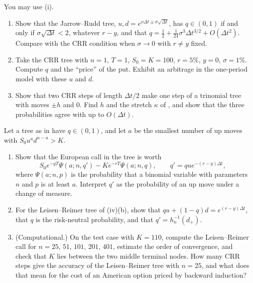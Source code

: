 
\begin{exercise}\label{ex:fd-validity}
\easy You may use (i).
\begin{enumerate}[label=(\alph*)]
  \item Show that the Jarrow--Rudd tree, $u,d=e^{\nu\Delta t\pm\sigma\sqrt{\Delta t}}$, has $q\in(0,1)$ if and only if
    $\sigma\sqrt{\Delta t}<2$, whatever $r-y$, and that $q=\frac12+\frac1{24}\sigma^3\Delta t^{3/2}+O(\Delta t^2)$. Compare with
    the CRR condition when $\sigma\to0$ with $r\ne y$ fixed.
  \item Take the CRR tree with $n=1$, $T=1$, $S_0=K=100$, $r=5\%$, $y=0$, $\sigma=1\%$. Compute $q$ and the
    ``price''  of the put. Exhibit an arbitrage in the one-period model with these $u$
    and $d$.
  \item Show that two CRR steps of length $\Delta t/2$ make one step of a trinomial tree with moves $\pm h$
    and $0$. Find $h$ and the stretch $\kappa$ of , and show that the three probabilities
    agree with  up to $O(\Delta t)$.
\end{enumerate}
\end{exercise}

\begin{exercise}\label{ex:fd-leisen-reimer}
\medium Let a tree as in  have $q\in(0,1)$, and let $a$ be the smallest number of up
moves with $S_0u^ad^{n-a}>K$.
\begin{enumerate}[label=(\alph*)]
  \item Show that the European call in the tree is worth
    \[
      S_0e^{-yT}\Psi(a;n,q')-Ke^{-rT}\Psi(a;n,q),\qquad q'=que^{-(r-y)\Delta t},
    \]
    where $\Psi(a;n,p)$ is the probability that a binomial variable with parameters $n$ and $p$ is at
    least $a$. Interpret $q'$ as the probability of an up move under a change of measure.
  \item For the Leisen--Reimer tree of (iv)(b), show that
    $qu+(1-q)d=e^{(r-y)\Delta t}$, that $q$ is the risk-neutral probability, and that $q'=h_n^{-1}(d_+)$.
  \item (Computational.) On the test case with $K=110$, compute the Leisen--Reimer call for $n=25$,
    $51$, $101$, $201$, $401$, estimate the order of convergence, and check that $K$ lies between the two
    middle terminal nodes. How many CRR steps give the accuracy of the Leisen--Reimer tree with $n=25$, and what
    does that mean for the cost of an American option priced by backward induction?
\end{enumerate}
\end{exercise}

